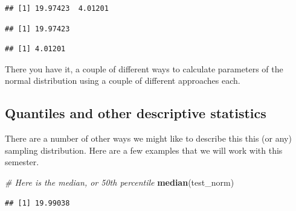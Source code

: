 \documentclass[
]{book}
\newenvironment{Shaded}{\begin{snugshade}}{\end{snugshade}}
\newcommand{\CommentTok}[1]{\textcolor[rgb]{0.56,0.35,0.01}{\textit{#1}}}
\newcommand{\DataTypeTok}[1]{\textcolor[rgb]{0.13,0.29,0.53}{#1}}
\newcommand{\DecValTok}[1]{\textcolor[rgb]{0.00,0.00,0.81}{#1}}
\newcommand{\FloatTok}[1]{\textcolor[rgb]{0.00,0.00,0.81}{#1}}
\newcommand{\KeywordTok}[1]{\textcolor[rgb]{0.13,0.29,0.53}{\textbf{#1}}}
\newcommand{\NormalTok}[1]{#1}
\newcommand{\OperatorTok}[1]{\textcolor[rgb]{0.81,0.36,0.00}{\textbf{#1}}}
\begin{document}
\begin{verbatim}
## [1] 19.97423  4.01201
\end{verbatim}

\begin{Shaded}
\end{Shaded}

\begin{verbatim}
## [1] 19.97423
\end{verbatim}

\begin{Shaded}
\end{Shaded}

\begin{verbatim}
## [1] 4.01201
\end{verbatim}

There you have it, a couple of different ways to calculate parameters of the normal distribution using a couple of different approaches each.

\hypertarget{quantiles-and-other-descriptive-statistics}{%
\subsection{Quantiles and other descriptive statistics}\label{quantiles-and-other-descriptive-statistics}}

There are a number of other ways we might like to describe this this (or any) sampling distribution. Here are a few examples that we will work with this semester.

\begin{Shaded}
\begin{Highlighting}[]
\CommentTok{# Here is the median, or 50th percentile}
\KeywordTok{median}\NormalTok{(test_norm) }
\end{Highlighting}
\end{Shaded}

\begin{verbatim}
## [1] 19.99038
\end{verbatim}

\begin{Shaded}
\end{Shaded}
\end{document}
